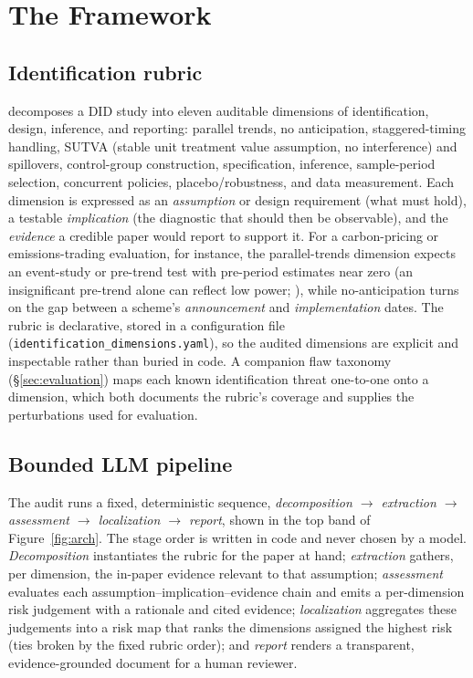 \section{The \sys{} Framework}
\label{sec:framework}

\subsection{Identification rubric}
\sys{} decomposes a DID study into eleven auditable dimensions of
identification, design, inference, and reporting: parallel trends, no
anticipation, staggered-timing handling, SUTVA (stable unit treatment value
assumption, no interference) and spillovers,
control-group construction, specification, inference, sample-period selection,
concurrent policies, placebo/robustness, and data measurement. Each dimension is
expressed as an \emph{assumption} or design requirement (what must hold), a
testable \emph{implication} (the diagnostic that should then be observable),
and the \emph{evidence} a credible paper would report to support it. For a carbon-pricing
or emissions-trading evaluation, for instance, the parallel-trends dimension
expects an event-study or pre-trend test with pre-period estimates near zero
(an insignificant pre-trend alone can reflect low power; \citealp{roth2022}), while
no-anticipation turns on the gap between a scheme's \emph{announcement} and
\emph{implementation} dates. The rubric is declarative, stored in a configuration
file (\texttt{identification\_dimensions.yaml}), so the audited dimensions are
explicit and inspectable rather than buried in code. A companion flaw taxonomy
(\S\ref{sec:evaluation}) maps each known identification threat one-to-one onto a
dimension, which both documents the rubric's coverage and supplies the
perturbations used for evaluation.

\subsection{Bounded LLM pipeline}
\label{sec:pipeline}
The audit runs a fixed, deterministic sequence, \emph{decomposition
$\rightarrow$ extraction $\rightarrow$ assessment $\rightarrow$ localization
$\rightarrow$ report}, shown in the top band of Figure~\ref{fig:arch}. The stage
order is written in code and never chosen by a model. \emph{Decomposition}
instantiates the rubric for the paper at hand; \emph{extraction} gathers, per
dimension, the in-paper evidence relevant to that assumption; \emph{assessment}
evaluates each assumption--implication--evidence chain and emits a per-dimension
risk judgement with a rationale and cited evidence; \emph{localization}
aggregates these judgements into a risk map that ranks the dimensions assigned
the highest risk (ties broken by the fixed rubric order); and
\emph{report} renders a transparent, evidence-grounded document for a human
reviewer.

